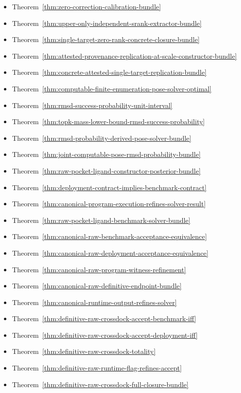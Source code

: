 \begin{itemize}
\item Theorem~\ref{thm:zero-correction-calibration-bundle}
\item Theorem~\ref{thm:upper-only-independent-srank-extractor-bundle}
\item Theorem~\ref{thm:single-target-zero-rank-concrete-closure-bundle}
\item Theorem~\ref{thm:attested-provenance-replication-at-scale-constructor-bundle}
\item Theorem~\ref{thm:concrete-attested-single-target-replication-bundle}
\item Theorem~\ref{thm:computable-finite-enumeration-pose-solver-optimal}
\item Theorem~\ref{thm:rmsd-success-probability-unit-interval}
\item Theorem~\ref{thm:topk-mass-lower-bound-rmsd-success-probability}
\item Theorem~\ref{thm:rmsd-probability-derived-pose-solver-bundle}
\item Theorem~\ref{thm:joint-computable-pose-rmsd-probability-bundle}
\item Theorem~\ref{thm:raw-pocket-ligand-constructor-posterior-bundle}
\item Theorem~\ref{thm:deployment-contract-implies-benchmark-contract}
\item Theorem~\ref{thm:canonical-program-execution-refines-solver-result}
\item Theorem~\ref{thm:raw-pocket-ligand-benchmark-solver-bundle}
\item Theorem~\ref{thm:canonical-raw-benchmark-acceptance-equivalence}
\item Theorem~\ref{thm:canonical-raw-deployment-acceptance-equivalence}
\item Theorem~\ref{thm:canonical-raw-program-witness-refinement}
\item Theorem~\ref{thm:canonical-raw-definitive-endpoint-bundle}
\item Theorem~\ref{thm:canonical-runtime-output-refines-solver}
\item Theorem~\ref{thm:definitive-raw-crossdock-accept-benchmark-iff}
\item Theorem~\ref{thm:definitive-raw-crossdock-accept-deployment-iff}
\item Theorem~\ref{thm:definitive-raw-crossdock-totality}
\item Theorem~\ref{thm:definitive-raw-runtime-flag-refines-accept}
\item Theorem~\ref{thm:definitive-raw-crossdock-full-closure-bundle}

\end{itemize}
